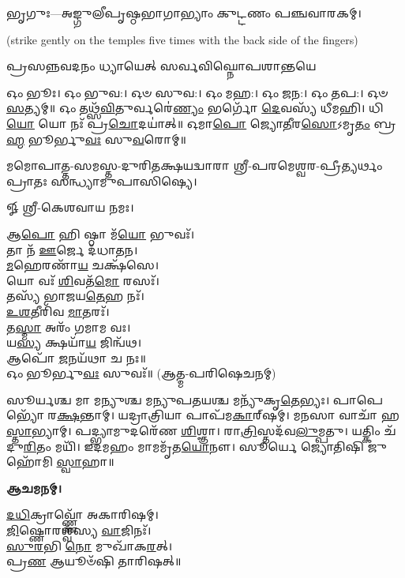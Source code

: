 
𑌭𑍃𑌗𑍁𑌃—𑌅𑌙𑍍𑌗𑍁𑌲𑍀𑌪𑍃𑌷𑍍𑌠𑌭𑌾𑌗𑌾𑌭𑍍𑌯𑌾𑌂 𑌕𑍁𑌟𑍍𑌟𑌣𑌂 𑌪𑌞𑍍𑌚𑌵𑌾𑌰𑌕𑌮𑍍।

{\scriptsize (strike gently on the temples five times with the back side of the fingers)}

{𑌪𑍍𑌰𑌸𑌨𑍍𑌨𑌵𑌦𑌨𑌂 𑌧𑍍𑌯𑌾𑌯𑍇𑌤𑍍 𑌸𑌰𑍍𑌵𑌵𑌿𑌘𑍍𑌨𑍋𑌪𑌶𑌾𑌨𑍍𑌤𑌯𑍇}


𑌓𑌂 𑌭𑍂𑌃। 𑌓𑌂 𑌭𑍁𑌵:। 𑌓𑍞 𑌸𑍁𑌵:। 𑌓𑌂 𑌮𑌹:। 𑌓𑌂 𑌜𑌨:। 𑌓𑌂 𑌤𑌪:। 𑌓𑍞 \ul{𑌸}\-𑌤𑍍𑌯𑌮𑍍॥
𑌓𑌂 𑌤𑌥𑍍𑌸᳴\-\ul{𑌵𑌿}\-𑌤𑍁𑌰𑍍𑌵𑌰𑍇॑\-\ul{𑌣𑍍𑌯𑌂} 𑌭𑌰𑍍𑌗𑍋᳴ \ul{𑌦𑍇}\-𑌵𑌸𑍍𑌯᳴ 𑌧𑍀𑌮𑌹𑌿। 𑌧𑌿\-\ul{𑌯𑍋} 𑌯𑍋 𑌨𑌃᳴ 𑌪𑍍𑌰\-\ul{𑌚𑍋}\-𑌦𑌯𑌾॑𑌤𑍍॥
𑌓𑌮𑌾\-\ul{𑌪𑍋} 𑌜𑍍𑌯𑍋\-\ul{𑌤𑍀}\-𑌰\-\ul{𑌸𑍋}\-𑌽𑌮𑍃\-\ul{𑌤𑌂} 𑌬𑍍𑌰\-\ul{𑌹𑍍𑌮} 𑌭𑍂𑌰𑍍𑌭𑍁\-\ul{𑌵𑌃} 𑌸𑍁\-\ul{𑌵}\-𑌰𑍋𑌮𑍍॥


𑌮𑌮𑍋𑌪𑌾𑌤𑍍𑌤-𑌸𑌮𑌸𑍍𑌤-𑌦𑍁𑌰𑌿𑌤𑌕𑍍𑌷𑌯𑌦𑍍𑌵𑌾𑌰𑌾 𑌶𑍍𑌰𑍀-𑌪𑌰𑌮𑍇𑌶𑍍𑌵𑌰-𑌪𑍍𑌰𑍀𑌤𑍍𑌯𑌰𑍍𑌥𑌂 𑌪𑍍𑌰𑌾𑌤𑌃 𑌸𑌨𑍍𑌧𑍍𑌯𑌾𑌮𑍁𑌪𑌾𑌸𑌿𑌷𑍍𑌯𑍇।


𑍐 𑌶𑍍𑌰𑍀-𑌕𑍇𑌶𑌵𑌾𑌯 𑌨𑌮𑌃।

𑌆\-\ul{𑌪𑍋} 𑌹𑌿 𑌷𑍍𑌠𑌾 𑌮᳴\-\ul{𑌯𑍋} 𑌭𑍁𑌵𑌃᳴।\\
𑌤𑌾 𑌨᳴ \ul{𑌊}\-𑌰𑍍𑌜𑍇 𑌦᳴𑌧𑌾𑌤𑌨।\\
\-\ul{𑌮}\-𑌹𑍇𑌰𑌣𑌾᳴\-\ul{𑌯} 𑌚𑌕𑍍𑌷᳴𑌸𑍇।\\
𑌯𑍋 𑌵𑌃᳴ \ul{𑌶𑌿}\-𑌵𑌤᳴\-\ul{𑌮𑍋} 𑌰𑌸𑌃᳴।\\
𑌤𑌸𑍍𑌯᳴ 𑌭𑌾𑌜𑌯\-\ul{𑌤𑍇}\-𑌹 𑌨𑌃᳴।\\
\-\ul{𑌉}\-\-\ul{𑌶}\-𑌤𑍀𑌰𑌿᳴𑌵 \ul{𑌮𑌾}\-𑌤𑌰𑌃᳴।\\
𑌤\-\ul{𑌸𑍍𑌮𑌾} 𑌅𑌰𑌂᳴ 𑌗𑌮𑌾𑌮 𑌵𑌃।\\
𑌯\-\ul{𑌸𑍍𑌯} 𑌕𑍍𑌷𑌯𑌾᳴\-\ul{𑌯} 𑌜𑌿𑌨𑍍𑌵᳴𑌥।\\
𑌆𑌪𑍋᳴ \ul{𑌜}\-𑌨𑌯᳴𑌥𑌾 𑌚 𑌨𑌃॥\\

𑌓𑌂 𑌭𑍂𑌰𑍍𑌭𑍁\-\ul{𑌵𑌃} 𑌸𑍁𑌵𑌃᳴॥ (𑌆𑌤𑍍𑌮-𑌪𑌰𑌿𑌷𑍇𑌚𑌨𑌮𑍍)



𑌸𑍂𑌰𑍍𑌯𑌶𑍍𑌚 𑌮𑌾 𑌮𑌨𑍍𑌯𑍁𑌶𑍍𑌚 𑌮𑌨𑍍𑌯𑍁𑌪𑌤𑌯𑌶𑍍𑌚 𑌮𑌨𑍍𑌯𑍁᳴𑌕𑍃\-\ul{𑌤𑍇}\-𑌭𑍍𑌯𑌃। 𑌪𑌾𑌪𑍇𑌭𑍍𑌯𑍋᳴ 𑌰\-\ul{𑌕𑍍𑌷}\-𑌨𑍍𑌤𑌾𑌮𑍍। 𑌯𑌦𑍍𑌰𑌾𑌤𑍍𑌰𑌿𑌯𑌾 𑌪𑌾𑌪᳴𑌮\-\ul{𑌕𑌾}\-𑌰𑍍‌𑌷𑌮𑍍। 𑌮𑌨𑌸𑌾 𑌵𑌾𑌚𑌾᳴ 𑌹\-\ul{𑌸𑍍𑌤𑌾}\-𑌭𑍍𑌯𑌾𑌮𑍍। 𑌪𑌦𑍍𑌭𑍍𑌯𑌾𑌮𑍁𑌦𑌰𑍇᳴𑌣 \ul{𑌶𑌿}\-𑌶𑍍𑌞𑌾। 𑌰𑌾\-\ul{𑌤𑍍𑌰𑌿}\-𑌸𑍍𑌤𑌦᳴𑌵\-\ul{𑌲𑍁}\-𑌮𑍍𑌪𑌤𑍁। 𑌯𑌤𑍍𑌕𑌿𑌂 𑌚᳴ 𑌦𑍁\-\ul{𑌰𑌿}\-𑌤𑌂 𑌮𑌯𑌿᳴। 𑌇𑌦𑌮𑌹𑌂 𑌮𑌾𑌮𑌮𑍃᳴𑌤\-\ul{𑌯𑍋}\-𑌨𑍗। 𑌸𑍂𑌰𑍍𑌯𑍇 𑌜𑍍𑌯𑍋𑌤𑌿𑌷𑌿 𑌜𑍁𑌹𑍋᳴𑌮𑌿 \ul{𑌸𑍍𑌵𑌾}\-𑌹𑌾॥


\textbf{𑌆𑌚𑌮𑌨𑌮𑍍।}

\-\ul{𑌦}\-\-\ul{𑌧𑌿}\-𑌕𑍍𑌰𑌾𑌵𑍍𑌣𑍍𑌣𑍋᳴ 𑌅𑌕𑌾𑌰𑌿𑌷𑌮𑍍।\\
 \ul{𑌜𑌿}\-𑌷𑍍𑌣𑍋𑌰𑌶𑍍𑌵᳴𑌸𑍍𑌯 \ul{𑌵𑌾}\-𑌜𑌿𑌨𑌃᳴।\\
\-\ul{𑌸𑍁}\-\-\ul{𑌰}\-𑌭𑌿 \ul{𑌨𑍋} 𑌮𑍁𑌖𑌾᳴𑌕\-\ul{𑌰}\-𑌤𑍍।\\
𑌪𑍍𑌰\-\ul{𑌣} 𑌆𑌯𑍂𑍞᳴𑌷𑌿 𑌤𑌾𑌰𑌿𑌷𑌤𑍍॥\\



